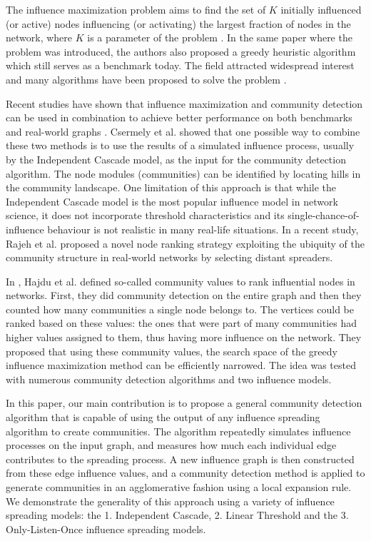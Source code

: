 \documentclass[pdflatex,sn-mathphys-num]{sn-jnl}
\begin{document}
The influence maximization problem aims to find the set of $K$ initially influenced (or active) nodes influencing (or activating) the largest fraction of nodes in the network, where $K$ is a parameter of the problem \cite{kempe}. In the same paper where the problem was introduced, the authors also proposed a greedy heuristic algorithm which still serves as a benchmark today. The field attracted widespread interest and many algorithms have been proposed to solve the problem \cite{lisurvey}.

Recent studies have shown that influence maximization and community detection can be used in combination to achieve better performance on both benchmarks and real-world graphs \cite{csermely, rajeh, evaluating}. Csermely et al. \cite{csermely} showed that one possible way to combine these two methods is to use the results of a simulated influence process, usually by the Independent Cascade model, as the input for the community detection algorithm. The node modules (communities) can be identified by locating hills in the community landscape. One limitation of this approach is that while the Independent Cascade model is the most popular influence model in network science, it does not incorporate threshold characteristics and its single-chance-of-influence behaviour is not realistic in many real-life situations. In a recent study, Rajeh et al. \cite{rajeh} proposed a novel node ranking strategy exploiting the ubiquity of the community structure in real-world networks by selecting distant spreaders.

In \cite{evaluating}, Hajdu et al. defined so-called community values to rank influential nodes in networks. First, they did community detection on the entire graph and then they counted how many communities a single node belongs to. The vertices could be ranked based on these values: the ones that were part of many communities had higher values assigned to them, thus having more influence on the network. They proposed that using these community values, the search space of the greedy influence maximization method can be efficiently narrowed. The idea was tested with numerous community detection algorithms and two influence models.

In this paper, our main contribution is to propose a general community detection algorithm that is capable of using the output of any influence spreading algorithm to create communities. The algorithm repeatedly simulates influence processes on the input graph, and measures how much each individual edge contributes to the spreading process. A new influence graph is then constructed from these edge influence values, and a community detection method is applied to generate communities in an agglomerative fashion using a local expansion rule. We demonstrate the generality of this approach using a variety of influence spreading models: the 1. Independent Cascade, 2. Linear Threshold and the 3. Only-Listen-Once influence spreading models. 
\end{document}
